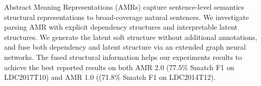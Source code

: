 Abstract Meaning Representations (AMRs) capture sentence-level semantics structural representations to broad-coverage natural sentences. We investigate parsing AMR with explicit dependency structures and interpretable latent structures. We generate the latent soft structure without additional annotations, and fuse both dependency and latent structure via an extended graph neural networks. The fused structural information helps our experiments results to achieve the best reported results on both AMR 2.0 (77.5\% \textrm{Smatch} F1 on LDC2017T10) and AMR 1.0 ((71.8\% \textrm{Smatch} F1 on LDC2014T12).
